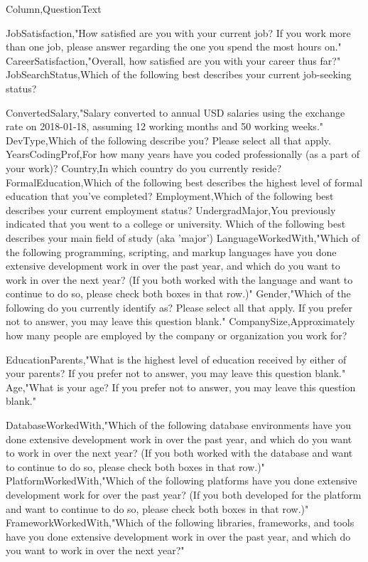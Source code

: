 \begin{appendices}
Column,QuestionText


JobSatisfaction,"How satisfied are you with your current job? If you work more than one job, please answer regarding the one you spend the most hours on."
CareerSatisfaction,"Overall, how satisfied are you with your career thus far?"
JobSearchStatus,Which of the following best describes your current job-seeking status?

ConvertedSalary,"Salary converted to annual USD salaries using the exchange rate on 2018-01-18, assuming 12 working months and 50 working weeks."
DevType,Which of the following describe you? Please select all that apply.
YearsCodingProf,For how many years have you coded professionally (as a part of your work)?
Country,In which country do you currently reside?
FormalEducation,Which of the following best describes the highest level of formal education that you’ve completed?
Employment,Which of the following best describes your current employment status?
UndergradMajor,You previously indicated that you went to a college or university. Which of the following best describes your main field of study (aka 'major')
LanguageWorkedWith,"Which of the following programming, scripting, and markup languages have you done extensive development work in over the past year, and which do you want to work in over the next year?  (If you both worked with the language and want to continue to do so, please check both boxes in that row.)"
Gender,"Which of the following do you currently identify as? Please select all that apply. If you prefer not to answer, you may leave this question blank."
CompanySize,Approximately how many people are employed by the company or organization you work for?

EducationParents,"What is the highest level of education received by either of your parents? If you prefer not to answer, you may leave this question blank."
Age,"What is your age? If you prefer not to answer, you may leave this question blank."

DatabaseWorkedWith,"Which of the following database environments have you done extensive development work in over the past year, and which do you want to work in over the next year?   (If you both worked with the database and want to continue to do so, please check both boxes in that row.)"
PlatformWorkedWith,"Which of the following platforms have you done extensive development work for over the past year?   (If you both developed for the platform and want to continue to do so, please check both boxes in that row.)"
FrameworkWorkedWith,"Which of the following libraries, frameworks, and tools have you done extensive development work in over the past year, and which do you want to work in over the next year?"



\end{appendices}
